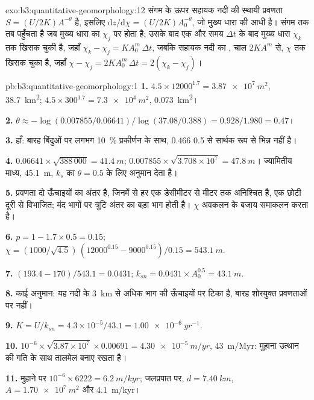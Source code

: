\begin{solution}{exo:b3:quantitative-geomorphology:12}
संगम के ऊपर सहायक नदी की स्थायी प्रवणता $S = (U/2K)A^{-\theta}$ है,
इसलिए $\mathrm{d}z/\mathrm{d}\chi = (U/2K)A_0^{-\theta}$, जो मुख्य धारा की आधी है।
 संगम तक तब पहुँचता है जब मुख्य धारा का $\chi_j$ पर होता है; उसके बाद एक और
समय $\Delta t$ के बाद मुख्य धारा $\chi_k$ तक खिसक चुकी है, जहाँ $\chi_k -
\chi_j = K A_0^m\,\Delta t$, जबकि सहायक नदी का , चाल $2KA^m$ से,
$\chi$ तक खिसक चुका है, जहाँ $\chi - \chi_j = 2KA_0^m\,\Delta t = 2(\chi_k -
\chi_j)$।
\end{solution}

\begin{solution}{pb:b3:quantitative-geomorphology:1}
\textbf{1.} $4.5\times12000^{1.7} = \qty{3.87e7}{m^2}$, \qty{38.7}{km^2};
$4.5\times300^{1.7} = \qty{7.3e4}{m^2}$, \qty{0.073}{km^2}।

\textbf{2.} $\theta \approx -\log(0.007855/0.06641)/\log(37.08/0.388) =
0.928/1.980 = 0.47$।

\textbf{3.} हाँ: बारह बिंदुओं पर लगभग \qty{10}{\percent} प्रकीर्णन के साथ,
$0.466$ 0.5 से सार्थक रूप से भिन्न नहीं है।

\textbf{4.} $0.06641\times\sqrt{388\,000} = \qty{41.4}{m}$;
$0.007855\times\sqrt{3.708\times10^7} = \qty{47.8}{m}$। ज्यामितीय माध्य,
\qty{45.1}{m}, $k_s$ का $\theta = 0.5$ के लिए अनुमान देता है।

\textbf{5.} प्रवणता दो ऊँचाइयों का अंतर है, जिनमें से हर एक
डेसीमीटर से मीटर तक अनिश्चित है, एक छोटी दूरी से विभाजित; मंद भागों पर
त्रुटि अंतर का बड़ा भाग होती है। $\chi$ अवकलन के बजाय
समाकलन करता है।

\textbf{6.} $p = 1 - 1.7\times0.5 = 0.15$; $\chi = (1000/\sqrt{4.5})\,
(12000^{0.15} - 9000^{0.15})/0.15 = \qty{543.1}{m}$.

\textbf{7.} $(193.4 - 170)/543.1 = 0.0431$; $k_{sn} = 0.0431\times A_0^{0.5}
= \qty{43.1}{m}$.

\textbf{8.} काई अनुमान: यह नदी के \qty{3}{km} से अधिक भाग की
ऊँचाइयों पर टिका है, बारह शोरयुक्त प्रवणताओं पर नहीं।

\textbf{9.} $K = U/k_{sn} = 4.3\times10^{-5}/43.1 = \qty{1.00e-6}{yr^{-1}}$.

\textbf{10.} $10^{-6}\times\sqrt{3.87\times10^7}\times0.00691 =
\qty{4.30e-5}{m/yr}$, \qty{43}{m/Myr}: मुहाना उत्थान की
गति के साथ तालमेल बनाए रखता है।

\textbf{11.} मुहाने पर $10^{-6}\times6222 = \qty{6.2}{m/kyr}$;
जलप्रपात पर, $d = \qty{7.40}{km}$, $A = \qty{1.70e7}{m^2}$ और
\qty{4.1}{m/kyr}।


\end{solution}

